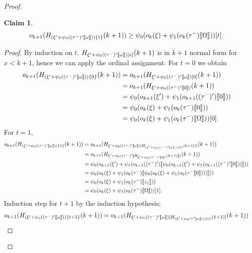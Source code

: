 \documentclass{amsart}
\theoremstyle{plain}
\theoremstyle{plain}
\newtheorem{claim}[theorem]{Claim}
\def\scbrl{[\hspace{-.14em}[}
\def\scbrr{]\hspace{-.14em}]}
\def\scbr#1{\scbrl#1\scbrr}
\newcommand{\Om}{{\Omega}}
\newcommand{\okpe}{o_{k+1}}
\newcommand{\ok}{o_{k}}
\newcommand{\om}{\omega}
\def\scbrl{[\hspace{-.14em}[}
\def\scbrr{]\hspace{-.14em}]}
\def\scbr#1{\scbrl#1\scbrr}
\begin{document}
\begin{proof}
\begin{Cases}
\begin{Cases}
\begin{Cases}
            \begin{claim}\label{ClaimIndOm}
                \[\okpe(H_{(\xi'+\psi_0((\tau^-)'\scbr{\om}))\{t\}}(k+1))  \geq \psi_0( \ok(\xi)+ \psi_1(\ok(\tau^-)\scbr{\Om}))[t].\]
            \end{claim}
            \begin{proof}
                By induction on $t$. $H_{\xi'+\psi_0((\tau^-)'\scbr{\om})[x]}(k+1)$ is in $k+1$ normal form for $x<k+1$, hence we can apply the ordinal assignment. For $t=0$ we obtain
                \begin{align*}
                    \okpe(H_{(\xi'+\psi_0((\tau^-)'\scbr{\om}))\{0\}}(k+1)) &= \okpe(H_{\xi'+\psi_0((\tau^-)'\scbr{\om})[0]}(k+1)) \\
                    &= \okpe(H_{\xi'+\psi_0((\tau^-)'\scbr{0})}(k+1)) \\
                    &= \psi_0(\okpe(\xi')+\psi_1(\okpe((\tau^-)')\scbr{0}))\\
                    &= \psi_0( \ok(\xi)+ \psi_1(\ok(\tau^-)\scbr{0 }))\\
                    &= \psi_0( \ok(\xi)+ \psi_1(\ok(\tau^-)\scbr{\Om}))[0].\\
                \end{align*}    
                For $t=1,$
                \begin{align*}
                    \okpe(H_{(\xi'+\psi_0((\tau^-)'\scbr{\om}))\{1\}}(k+1)) 
                    &= \okpe(H_{\xi'+\psi_0((\tau^-)'\scbr{\om}) [H_{(\xi' + \psi_0((\tau^-)'\scbr{\om}))\{0\}}(k+1)])}(k+1)) \\
                    &=\okpe(H_{\xi'+\psi_0((\tau^-)'\scbr{H_{\xi' + \psi_0((\tau^-)'\scbr{0})}(k+1)})}(k+1)) \\
                    &= \psi_0(\okpe(\xi')+\psi_1(\okpe((\tau^-)')\scbr{\psi_0(\okpe(\xi')+\psi_1(\okpe((\tau^-)'\scbr{0}))}) )\\
                    &= \psi_0( \ok(\xi)+ \psi_1(\ok(\tau^-)\scbr{\psi_0(\ok(\xi)+ \psi_1(\ok(\tau^-\scbr{0}))) }))\\
                    &= \psi_0( \ok(\xi)+ \psi_1(\ok(\tau^-)\scbr{z_1}))\\
                    &= \psi_0( \ok(\xi)+ \psi_1(\ok(\tau^-)\scbr{\Om}))[1].
                \end{align*}
                Induction step for $t+1$ by the induction hypothesis;
                \begin{align*}
                    \okpe(H_{(\xi'+\psi_0((\tau^-)'\scbr{\om}))\{t+1\}}(k+1)) &=\okpe(H_{\xi'+\psi_0((\tau^-)'\scbr{\om})	[H_{(\xi' + \psi_0(\tau'\scbr{\om}))\{t\}}(k+1)]}(k+1)) \\

\end{align*}
\end{proof}
\end{Cases}
\end{Cases}
\end{Cases}
\end{proof}
\end{document}
